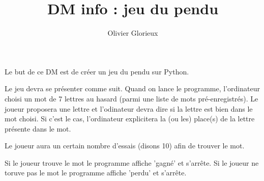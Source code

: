 \documentclass[a4paper, 11pt,reqno]{article}
\author{Olivier Glorieux}
\begin{document}
 \title{DM info : jeu du pendu} 

\noindent Le but de ce DM est de créer un jeu du pendu sur Python. 


Le jeu devra se présenter comme suit. Quand on lance le programme, l'ordinateur choisi un mot de 7 lettres au hasard (parmi une liste de mots pré-enregistrés). Le joueur proposera une lettre et l'odinateur devra dire si la lettre est bien dans le mot choisi. Si c'est le cas, l'ordinateur explicitera la (ou les) place(s) de la lettre présente dans le mot.

Le joueur aura un certain nombre d'essais (disons 10) afin de trouver le mot. 

Si le joueur trouve le mot le programme affiche 'gagné' et s'arrête. Si le joueur ne toruve pas le mot le programme affiche 'perdu' et s'arrête. 
\end{document}
